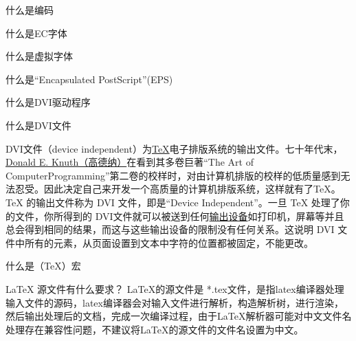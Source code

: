 \begin{faq}{什么是编码}
\end{faq}

\begin{faq}{什么是EC字体}
\end{faq}

\begin{faq}{什么是虚拟字体}
\end{faq}

\begin{faq}{什么是“Encapsulated PostScript”(EPS)}
\end{faq}

\begin{faq}{什么是DVI驱动程序}
\end{faq}

\begin{faq}{什么是DVI文件}

  DVI文件（device independent）为\href{https://baike.baidu.com/item/TeX}{TeX}电子排版系统的输出文件。七十年代末，\href{https://baike.baidu.com/item/Donald%20E.%20Knuth}{Donald E. Knuth（高德纳）}在看到其多卷巨著“The Art of ComputerProgramming”第二卷的校样时，对由计算机排版的校样的低质量感到无法忍受。因此决定自己来开发一个高质量的计算机排版系统，这样就有了TeX。TeX 的输出文件称为 DVI 文件，即是“Device Independent”。一旦 TeX 处理了你的文件，你所得到的 DVI文件就可以被送到任何\href{https://baike.baidu.com/item/%E8%BE%93%E5%87%BA%E8%AE%BE%E5%A4%87}{输出设备}如打印机，屏幕等并且总会得到相同的结果，而这与这些输出设备的限制没有任何关系。这说明 DVI 文件中所有的元素，从页面设置到文本中字符的位置都被固定，不能更改。

\end{faq}

\begin{faq}{什么是（\TeX{}）宏}
\end{faq}


\begin{faq}{\LaTeX{} 源文件有什么要求？}
  LaTeX的源文件是 *.tex文件，是指latex编译器处理输入文件的源码，latex编译器会对输入文件进行解析，构造解析树，进行渲染，然后输出处理后的文档，完成一次编译过程，由于LaTeX解析器可能对中文文件名处理存在兼容性问题，不建议将LaTeX的源文件的文件名设置为中文。
\end{faq}
